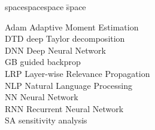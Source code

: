 
\begin{tabbing}
spacespacespace \= space \kill

Adam \> Adaptive Moment Estimation \\
DTD \> deep Taylor decomposition \\
DNN \> Deep Neural Network \\
GB  \> guided backprop \\
LRP \> Layer-wise Relevance Propagation \\
NLP \> Natural Language Processing \\
NN \> Neural Network \\
RNN \> Recurrent Neural Network \\
SA  \> sensitivity analysis \\


\end{tabbing}
